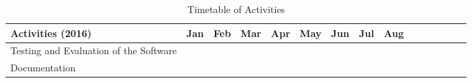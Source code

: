 \begin{landscape}
\begin{table}[ht]   %
\centering
\caption{Timetable of Activities} \vspace{0.25em}
\begin{tabular}{|p{2in}|c|c|c|c|c|c|c|c|c|c|c|c|c|c|} \hline
\centering Activities (2016)				& Jan		& Feb		& Mar		& Apr		 & May		 & Jun		& Jul		& Aug		\\ \hline
Testing and Evaluation of the Software		&~~~\weektwo& \weekfour &\weekthree~~&\weektwo~~~&~\weektwo~~& \weekfour & \weekfour&~~~\weektwo\\ \hline
Documentation								&~~~\weektwo& \weekfour &\weekthree~~&\weektwo~~~&~\weektwo~~& \weekfour & \weekfour &~~~\weektwo\\ \hline
\end{tabular}
\label{tab:timetableactivities2016}
\end{table}

\end{landscape}
